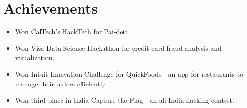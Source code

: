 \newcommand\textlcsc[1]{\textsc{\MakeTextLowercase{#1}}}
\section{Achievements}
\begin{itemize}
\item Won CalTech's HackTech for Pai-deia.
\item Won Visa Data Science Hackathon for credit card fraud analysis and visualization.
\item Won Intuit Innovation Challenge for QuickFoods - an app for restaurants to manage their orders efficiently. 
\item Won third place in India Capture the Flag - an all India hacking contest.
\end{itemize}
